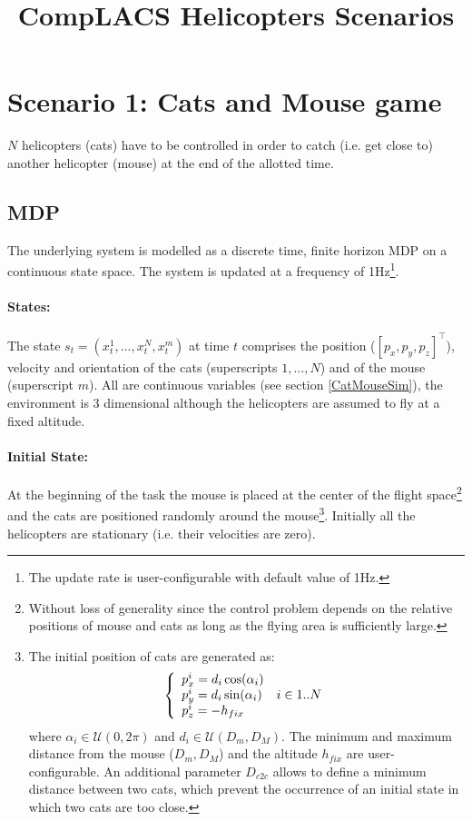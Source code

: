 \documentclass{article}
\begin{document}
\title{CompLACS Helicopters Scenarios}


\date{}
\author{}

\maketitle

\section{Scenario 1: Cats and Mouse game}
$N$ helicopters (cats) have to be controlled in order to catch (i.e. get close to) another helicopter (mouse) at the end of the allotted time.

\subsection{MDP}

The underlying system is modelled as a discrete time, finite horizon MDP on a continuous state space. The system is updated at a frequency of 1Hz\footnote{The update rate is user-configurable with default value of 1Hz.}. 

\paragraph{States:} The state $s_t = (x^1_t,...,x^{N}_t,x^m_t)$ at time $t$ comprises the position ($[p_x,p_y,p_z]^\intercal$), velocity and orientation of the cats (superscripts $1,...,N$) and of the mouse (superscript $m$). All are continuous variables (see section \ref{CatMouseSim}), the environment is 3 dimensional although the helicopters are assumed to fly at a fixed altitude.

\paragraph{Initial State:} At the beginning of the task the mouse is placed at the center of the flight space\footnote{Without loss of generality since the control problem depends on the relative positions of mouse and cats as long as the flying area is sufficiently large.} and the cats are positioned randomly around the mouse\footnote{
The initial position of cats are generated as:
$$
\left\{
\begin{array}{l l}
p^i_x =  d_i \cos(\alpha_i) & \\
p^i_y =  d_i \sin(\alpha_i) & i \in 1..N\\
p^i_z = - h_{fix} & \\
\end{array}
\right.
$$
where $\alpha_i \in \mathcal{U}(0,2\pi)$ and $d_i \in \mathcal{U}(D_m,D_M)$. The minimum and maximum distance from the mouse ($D_m,D_M$) and the altitude $h_{fix}$ are user-configurable.
An additional parameter $D_{c2c}$ allows to define a minimum distance between two cats, which prevent the occurrence of an initial state in which two cats are too close.
}.
Initially all the helicopters are stationary (i.e. their velocities are zero).
\end{document}
